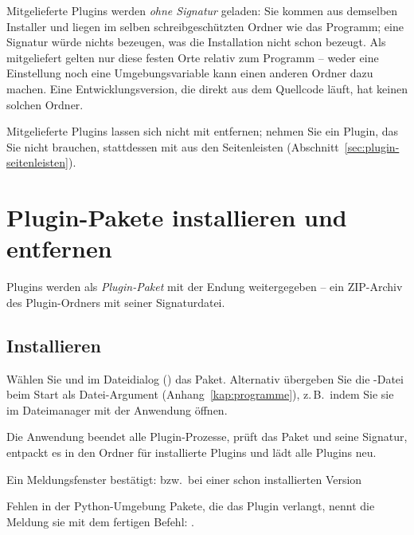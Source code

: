 Mitgelieferte Plugins werden \emph{ohne Signatur} geladen: Sie kommen aus demselben Installer und
liegen im selben schreibgeschützten Ordner wie das Programm; eine Signatur würde nichts bezeugen,
was die Installation nicht schon bezeugt. Als mitgeliefert gelten nur diese festen Orte relativ
zum Programm – weder eine Einstellung noch eine Umgebungsvariable kann einen anderen Ordner dazu
machen. Eine Entwicklungsversion, die direkt aus dem Quellcode läuft, hat keinen solchen Ordner.

Mitgelieferte Plugins lassen sich nicht mit  entfernen; nehmen Sie ein
Plugin, das Sie nicht brauchen, stattdessen mit  aus den
Seitenleisten (Abschnitt~\ref{sec:plugin-seitenleisten}).

\section{Plugin-Pakete installieren und entfernen}\label{sec:verwaltung-installieren}

Plugins werden als \emph{Plugin-Paket} mit der Endung  weitergegeben – ein
ZIP-Archiv des Plugin-Ordners mit seiner Signaturdatei.

\subsection{Installieren}

\begin{schritte}
  \item Wählen Sie  und im Dateidialog
        () das Paket. Alternativ übergeben Sie die
        -Datei beim Start als Datei-Argument (Anhang~\ref{kap:programme}),
        z.\,B.\ indem Sie sie im Dateimanager mit der Anwendung öffnen.
  \item Die Anwendung beendet alle Plugin-Prozesse, prüft das Paket und seine Signatur, entpackt
        es in den Ordner für installierte Plugins und lädt alle Plugins neu.
  \item Ein Meldungsfenster  bestätigt:  bzw.\ bei einer
        schon installierten Version 
  \item Fehlen in der Python-Umgebung Pakete, die das Plugin verlangt, nennt die Meldung sie mit
        dem fertigen Befehl: .
\end{schritte}

